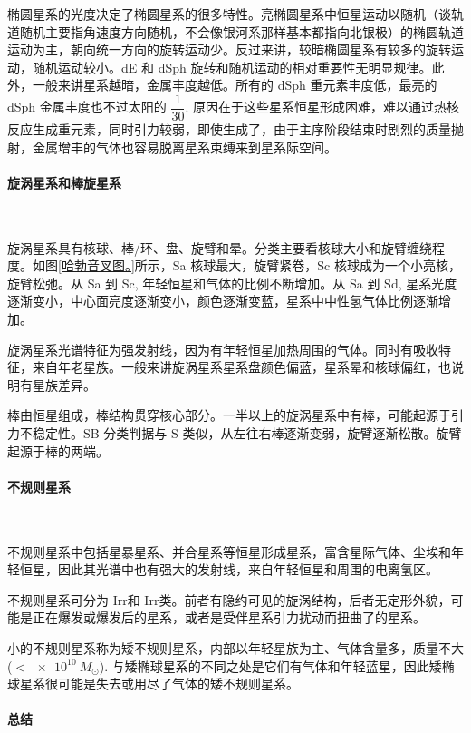 \documentclass[../天体物理基础.tex]{subfiles}
\begin{document}
椭圆星系的光度决定了椭圆星系的很多特性。亮椭圆星系中恒星运动以随机（谈轨道随机主要指角速度方向随机，不会像银河系那样基本都指向北银极）的椭圆轨道运动为主，朝向统一方向的旋转运动少。反过来讲，较暗椭圆星系有较多的旋转运动，随机运动较小。dE 和 dSph 旋转和随机运动的相对重要性无明显规律。此外，一般来讲星系越暗，金属丰度越低。所有的 dSph 重元素丰度低，最亮的 dSph 金属丰度也不过太阳的 $\dfrac{1}{30}$. 原因在于这些星系恒星形成困难，难以通过热核反应生成重元素，同时引力较弱，即使生成了，由于主序阶段结束时剧烈的质量抛射，金属增丰的气体也容易脱离星系束缚来到星系际空间。

\paragraph{旋涡星系和棒旋星系}~{}

旋涡星系具有核球、棒/环、盘、旋臂和晕。分类主要看核球大小和旋臂缠绕程度。如图\ref{哈勃音叉图。}所示，Sa 核球最大，旋臂紧卷，Sc 核球成为一个小亮核，旋臂松弛。从 Sa 到 Sc, 年轻恒星和气体的比例不断增加。从 Sa 到 Sd, 星系光度逐渐变小，中心面亮度逐渐变小，颜色逐渐变蓝，星系中中性氢气体比例逐渐增加。

旋涡星系光谱特征为强发射线，因为有年轻恒星加热周围的气体。同时有吸收特征，来自年老星族。一般来讲旋涡星系星系盘颜色偏蓝，星系晕和核球偏红，也说明有星族差异。

棒由恒星组成，棒结构贯穿核心部分。一半以上的旋涡星系中有棒，可能起源于引力不稳定性。SB 分类判据与 S 类似，从左往右棒逐渐变弱，旋臂逐渐松散。旋臂起源于棒的两端。

\paragraph{不规则星系}~{}

不规则星系中包括星暴星系、并合星系等恒星形成星系，富含星际气体、尘埃和年轻恒星，因此其光谱中也有强大的发射线，来自年轻恒星和周围的电离氢区。

不规则星系可分为 Irr\uppercase\expandafter{}和 Irr\uppercase\expandafter{}类。前者有隐约可见的旋涡结构，后者无定形外貌，可能是正在爆发或爆发后的星系，或者是受伴星系引力扰动而扭曲了的星系。

小的不规则星系称为矮不规则星系，内部以年轻星族为主、气体含量多，质量不大 ($<\qty{e10}{M_{\odot}}$). 与矮椭球星系的不同之处是它们有气体和年轻蓝星，因此矮椭球星系很可能是失去或用尽了气体的矮不规则星系。

\paragraph{总结}~{}
\end{document}
